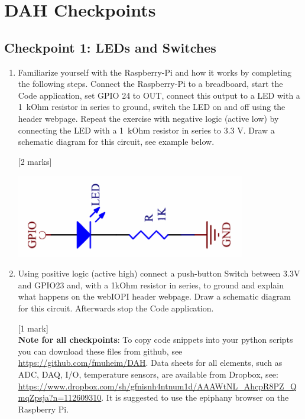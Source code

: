 \chapter{DAH Checkpoints}
\label{sec:checkpoints}

\section{Checkpoint  1: LEDs and Switches}

\begin{enumerate}
\item [1.1.] Familiarize yourself with the Raspberry-Pi and how it works by completing the following steps. Connect the Raspberry-Pi to a breadboard, start the \webIOPi Code application, set GPIO 24 to OUT, connect this output to a LED with a 1~kOhm resistor in series to ground, switch the LED on and off using the \webIOPi header webpage.  Repeat the exercise with negative logic (active low) by connecting the LED with a 1~kOhm resistor in series to 3.3 V.  Draw a schematic diagram for this circuit, see example below.  

\hfill [2 marks]
  
\begin{center}                                        
 {\includegraphics[width=10cm]{figs/ActiveHighLED}}
 \end{center}
                                                            
 
\item [1.2.] Using positive logic (active high) connect a push-button Switch between 3.3V and GPIO23 and, with a 1kOhm resistor in series, to ground and explain what happens on the webIOPI header webpage. Draw a schematic diagram for this circuit. Afterwards stop the  \webIOPi Code application.
 
 \hfill [1 mark]\\
                                                                                                         
{\bf Note for all checkpoints}: To copy code snippets into your python scripts you can download these files from github, see \url{https://github.com/fmuheim/DAH}.  Data sheets for all elements, such as ADC, DAQ, I/O, temperature sensors,  
 are available from Dropbox,
see: \url{https://www.dropbox.com/sh/gfnisnh4ntnum1d/AAAWtNL_AhcpR8PZ_QmqZpsja?n=112609310}.  It is suggested to use the epiphany browser on the Raspberry Pi.
 \\


\end{enumerate}
